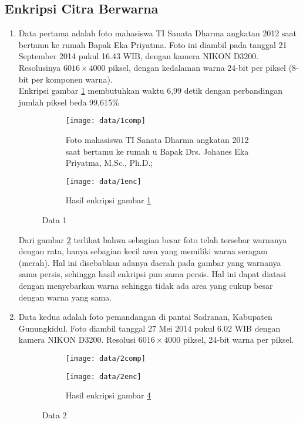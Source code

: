 \subsection{Enkripsi Citra Berwarna}
\begin{enumerate}[label=(\alph*)]
	\item Data pertama adalah foto mahasiswa TI Sanata Dharma angkatan 2012 saat bertamu ke 
	rumah Bapak Eka Priyatma. Foto ini diambil pada tanggal 
	21 September 2014 pukul 16.43 WIB, dengan kamera NIKON D3200. Resolusinya $6016\times 4000$ 
	piksel, dengan kedalaman warna 24-bit per piksel (8-bit per komponen warna).\\
	Enkripsi gambar \ref{gbr:plain1} membutuhkan waktu 6,99 detik dengan perbandingan jumlah piksel
	beda 99,615\%\\	
	\begin{figure}\centering
	\begin{subfigure}{\textwidth}
		\texttt{[image: data/1comp]}
		\caption{Foto mahasiswa TI Sanata Dharma angkatan 2012 saat bertamu ke rumah 
		u	Bapak Drs. Johanes Eka Priyatma, M.Sc., Ph.D.;}
		\label{gbr:plain1}
	\end{subfigure}
	\begin{subfigure}{\textwidth}
		\texttt{[image: data/1enc]}
		\caption{Hasil enkripsi gambar \ref{gbr:plain1}}
		\label{gbr:enc1}
	\end{subfigure}
	\caption{Data 1} \label{gbr:data1}
	\end{figure}
	Dari gambar \ref{gbr:enc1} terlihat bahwa sebagian besar foto telah tersebar warnanya dengan 
	rata, hanya sebagian kecil area yang memiliki warna seragam (merah). Hal ini disebabkan adanya
	daerah pada gambar yang warnanya sama persis, sehingga hasil enkripsi pun sama persis.
	Hal ini dapat diatasi dengan menyebarkan warna sehingga tidak ada area yang cukup besar dengan 
	warna yang sama.\\
	
	\item Data kedua adalah foto pemandangan di pantai Sadranan, Kabupaten Gunungkidul. Foto
	diambil tanggal 27 Mei 2014 pukul 6.02 WIB dengan kamera NIKON D3200. Resolusi $6016\times 4000$
	piksel, 24-bit warna per piksel.
	\begin{figure}\centering
		\begin{subfigure}{\textwidth}
		\texttt{[image: data/2comp]}
		\caption{}
		\label{gbr:plain2}
	\end{subfigure}
	\begin{subfigure}{\textwidth}
		\texttt{[image: data/2enc]}
		\caption{Hasil enkripsi gambar \ref{gbr:plain2}}
		\label{gbr:enc2}
	\end{subfigure}
	\caption{Data 2}
	\label{gbr:data2}
	\end{figure}
	

\end{enumerate}

